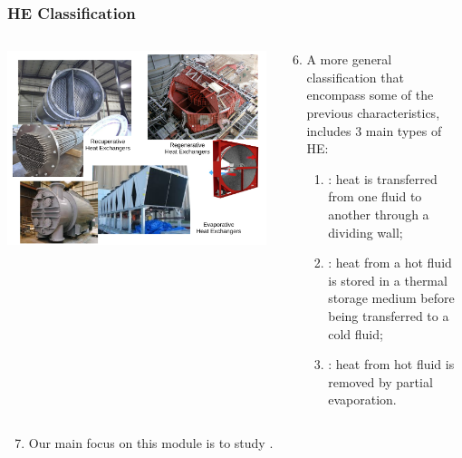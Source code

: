 \documentclass[10pt,compress,unknownkeysallowed]{beamer}
\begin{document}
\begin{frame}
 \frametitle{HE Classification}
    \begin{columns}
       \begin{column}[l]{0.58\linewidth}
         \includegraphics[width=1.1\columnwidth,clip]{./Pics/HeatExchangers_Examples}
       \end{column}
       \begin{column}[l]{0.42\linewidth}
          \begin{enumerate}\setcounter{enumi}{5}%
              \item<1-> A more general classification that encompass some of the previous characteristics, includes 3 main types of HE:
                \begin{enumerate}
                  \item<1-> : heat is transferred from one fluid to another through a dividing wall;
                  \item<2-> : heat from a hot fluid is stored in a thermal storage medium before being transferred to a cold fluid;
                  \item<3-> : heat from hot fluid is removed by partial evaporation.
                \end{enumerate}
          \end{enumerate}
       \end{column}      
    \end{columns}
          \begin{enumerate}\setcounter{enumi}{6}%
               \item<4-> Our main focus on this module is to study \underline{}.
          \end{enumerate}
\end{frame}
\end{document}

